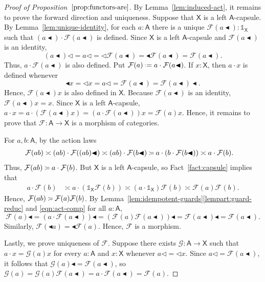 \documentclass{amsart}
\newcommand{\tin}{:}
\newcommand{\Cat}[1]{\mathsf{#1}}
\newcommand{\cat}[1]{\Cat{#1}}
\newcommand{\acat}[1]{\mathsf{#1}}
\numberwithin{lstfloat}{section}
\newcommand{\srcfunc}{\mathbin{\blacktriangleleft}}
\newcommand{\tgtfunc}{\mathbin{\blacktriangleleft}}
\newcommand{\src}[1]{#1\srcfunc}
\newcommand{\tgt}[1]{\tgtfunc #1}
\newcommand{\one}{\mathbb{1}}
\newcommand{\defeq}{\mathrel{\hstretch{.13}{=}\hspace{.2ex}{=}}}
\newcommand{\func}[1]{\mathcal{#1}}
\newcommand{\fF}{\func{F}}
\newcommand{\fG}{\func{G}}
\newcommand{\cA}{\cat{A}}
\newcommand{\cX}{\cat{X}}
\newcommand{\venturi}{%
  \mathrel{
    \begin{tikzpicture}[yscale=0.6,xscale=0.5]
        \draw (0ex,2.5ex) to (1ex,2ex);
        \draw (1ex,2ex) to (3ex,2ex);
        \draw (0ex,0.75ex) to (1ex,1.25ex);
        \draw (1ex,1.25ex) to (3ex,1.25ex);
    \end{tikzpicture}
  }
}
\theoremstyle{definition}
\theoremstyle{remark}
\numberwithin{equation}{section}
\begin{document}
\begin{proof}[Proof of Proposition~$\ref{prop:functors-are}$]
  By Lemma~\ref{lem:induced-act}, it remains to prove the forward direction and uniqueness. 
  Suppose that $\cX$ is a left $\cA$-capsule.
  By Lemma~\ref{lem:unique-identity}, for each $a:\cA$ there is a unique
  $\fF(\src{a}):\one_{\cX}$ such that $(\src{a})\cdot \fF(\src{a})$ is defined.
  Since $\cX$ is a left $\cA$-capsule and $\fF(\src{a})$ is an identity,
  \[
    (\src{a})\lhd=a\lhd=\lhd\fF(\src{a})=\tgt\fF(\src{a})=\fF(\src{a}).
  \]
  Thus, $a\cdot \fF(\src{a})$ is also defined. Put $\fF(a)\defeq a\cdot
  \fF(\src{a})$. If $x:\cX$, then $a\cdot x$ is defined whenever 
  \[
    \tgt{x}=\lhd x=a\lhd=\fF(\src{a})=\src{\fF(\src{a})}.
  \]
  Hence, $\fF(\src{a})x$ is also defined in $\cX$. Because $\fF(\src{a})$ is an
  identity, $\fF(\src{a})x=x$.  Since $\acat{X}$ is a left $\acat{A}$-capsule, $a\cdot x=a\cdot
  (\fF(\src{a}) x)=(a\cdot \fF(\src{a}))x=\fF(a)x$. Hence, it remains to prove
  that $\fF:\cA\to \cX$ is a morphism of categories.

  For $a,b\tin \acat{A}$, by the action laws
  \begin{align*}
    \func{F}(ab) 
     & \asymp (ab)\cdot \fF(\src{(ab)})
      \asymp (ab)\cdot \fF(\src{b})
      \venturi a\cdot (b\cdot \fF(\src{b}))
     \asymp a\cdot \func{F}(b).
  \end{align*}
  Thus, $\func{F}(ab) \venturi a\cdot \func{F}(b)$. 
But $\cX$ is a left $\cA$-capsule, so Fact~\ref{fact:capsule} implies that
  \begin{align}\label{eqn:act-comp}
    a\cdot \func{F}(b) &\asymp a\cdot (\one_{\cX}\func{F}(b)) \asymp (a\cdot \one_{\cX}) \func{F}(b) \asymp \func{F}(a)\func{F}(b).
  \end{align}
  Hence, $\func{F}(ab) \venturi \func{F}(a)\func{F}(b)$. By Lemma~\ref{lem:idempotent-guards}\ref{lempart:guard-reduc} and \eqref{eqn:act-comp} for all $a:\cA$, 
  \[
    \src{\fF(a)}= \src{(a\cdot \fF(\src{a}))}=\src{(\fF(a) \fF(\src{a}))}=\src{\fF(\src{a})}=\fF(\src{a}).
  \]
  Similarly, $\func{F}(\tgt{a}) = \tgt{\func{F}(a)}$. Hence, $\fF$ is a
  morphism.

  Lastly, we prove uniqueness of  $\fF$. Suppose there exists $\func{G}:
  \cA\to \cX$ such that $a\cdot x = \func{G}(a)x$ for every $a:\cA$ and $x:\cX$
  whenever $a\lhd = \lhd x$. Since $a\lhd=\fF(\src{a})$, it follows that
  $\src{\fG(a)}=\fF(\src{a})$, so $\func{G}(a) = \func{G}(a)\fF(\src{a}) =
  a\cdot \fF(\src{a})  = \fF(a)$.
\end{proof}
\end{document}
